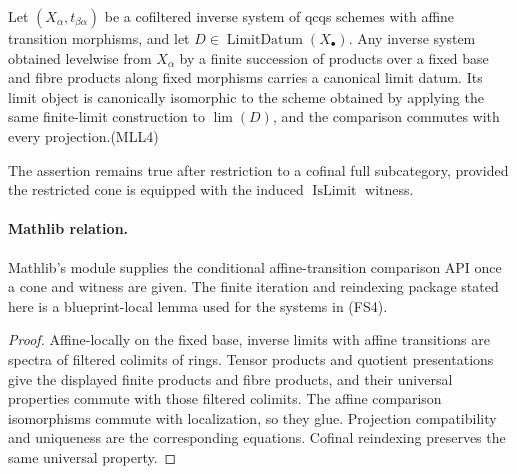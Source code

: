 \begin{lemma}
  \label{lemma:nagata-affine-transition-limit-base-change}

  Let $(X_\alpha,t_{\beta\alpha})$ be a cofiltered inverse system of qcqs
  schemes with affine transition morphisms, and let
  $D\in\operatorname{LimitDatum}(X_\bullet)$.  Any inverse system obtained
  levelwise from $X_\alpha$ by a finite succession of products over a fixed
  base and fibre products along fixed morphisms carries a canonical limit
  datum.  Its limit object is canonically isomorphic to the scheme obtained
  by applying the same finite-limit construction to $\lim(D)$, and the
  comparison commutes with every projection.\hfill\textup{(MLL4)}

  The assertion remains true after restriction to a cofinal full
  subcategory, provided the restricted cone is equipped with the induced
  $\operatorname{IsLimit}$ witness.

  \paragraph{Mathlib relation.}
  Mathlib's
  \texttt{}
  module supplies the conditional affine-transition comparison API once a
  cone and \texttt{} witness are
  given.  The finite iteration and reindexing package stated here is a
  blueprint-local lemma used for the systems in (FS4).
\end{lemma}

\begin{proof}
  Affine-locally on the fixed base, inverse limits with affine transitions
  are spectra of filtered colimits of rings.  Tensor products and quotient
  presentations give the displayed finite products and fibre products, and
  their universal properties commute with those filtered colimits.  The
  affine comparison isomorphisms commute with localization, so they glue.
  Projection compatibility and uniqueness are the corresponding
   equations.  Cofinal reindexing preserves
  the same universal property.
\end{proof}

